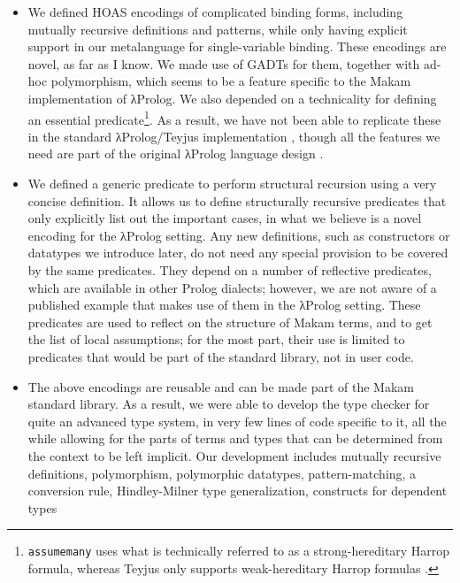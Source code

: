 \begin{itemize}
\item
  We defined HOAS encodings of complicated binding forms, including
  mutually recursive definitions and patterns, while only having
  explicit support in our metalanguage for single-variable binding.
  These encodings are novel, as far as I know. We made use of GADTs for
  them, together with ad-hoc polymorphism, which seems to be a feature
  specific to the Makam implementation of \foreignlanguage{greek}{λ}Prolog. We also depended on a
  technicality for defining an essential
  predicate\footnote{\texttt{assumemany} uses what is technically referred to
    as a strong-hereditary Harrop formula, whereas Teyjus only supports weak-hereditary
    Harrop formulas \citep{teyjus-main-reference}.}. As a result, we
  have not been able to replicate these in the standard \foreignlanguage{greek}{λ}Prolog/Teyjus
  implementation \citep{teyjus-main-reference}, though all the features
  we need are part of the original \foreignlanguage{greek}{λ}Prolog language design
  \citep{miller1988overview}.
\item
  We defined a generic predicate to perform structural recursion using a
  very concise definition. It allows us to define structurally recursive
  predicates that only explicitly list out the important cases, in what
  we believe is a novel encoding for the \foreignlanguage{greek}{λ}Prolog setting. Any new
  definitions, such as constructors or datatypes we introduce later, do
  not need any special provision to be covered by the same predicates.
  They depend on a number of reflective predicates, which are available
  in other Prolog dialects; however, we are not aware of a published
  example that makes use of them in the \foreignlanguage{greek}{λ}Prolog setting. These
  predicates are used to reflect on the structure of Makam terms, and to
  get the list of local assumptions; for the most part, their use is
  limited to predicates that would be part of the standard library, not
  in user code.
\item
  The above encodings are reusable and can be made part of the Makam
  standard library. As a result, we were able to develop the type
  checker for quite an advanced type system, in very few lines of code
  specific to it, all the while allowing for the parts of terms and
  types that can be determined from the context to be left implicit. Our
  development includes mutually recursive definitions, polymorphism,
  polymorphic datatypes, pattern-matching, a conversion rule,
  Hindley-Milner type generalization, constructs for dependent types

\end{itemize}
